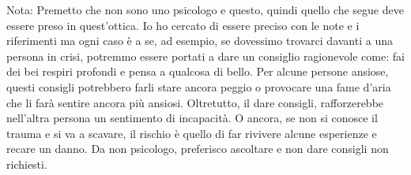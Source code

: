 \documentclass[12pt]{book} %
\begin{document}
\bigskip
\bigskip
\begin{mdframed}[linewidth=1pt]
Nota: Premetto che non sono uno psicologo e questo, quindi quello che segue deve essere preso in
quest'ottica. Io ho cercato di essere preciso con le note e i riferimenti ma ogni caso è a se, ad
esempio, se dovessimo trovarci davanti a una persona in crisi, potremmo essere portati a dare un consiglio ragionevole
come: fai dei bei respiri profondi e pensa a qualcosa di bello. Per alcune persone ansiose, questi consigli potrebbero
farli stare ancora peggio o provocare una fame d'aria che li farà sentire ancora più ansiosi.
Oltretutto, il dare consigli, rafforzerebbe nell'altra persona un sentimento di incapacità. O
ancora, se non si conosce il trauma e si va a scavare, il rischio è quello di far rivivere alcune esperienze e recare
un danno. Da non psicologo, preferisco ascoltare e non dare consigli non richiesti.
\end{mdframed}
\end{document}
